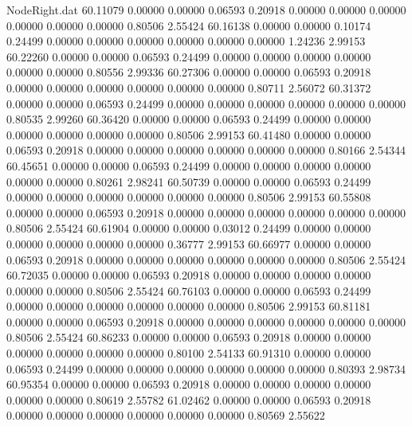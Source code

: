 \begin{filecontents}{NodeRight.dat}
  60.11079    0.00000    0.00000     0.06593    0.20918    0.00000    0.00000    0.00000    0.00000    0.00000    0.00000    0.80506    2.55424
  60.16138    0.00000    0.00000     0.10174    0.24499    0.00000    0.00000    0.00000    0.00000    0.00000    0.00000    1.24236    2.99153
  60.22260    0.00000    0.00000     0.06593    0.24499    0.00000    0.00000    0.00000    0.00000    0.00000    0.00000    0.80556    2.99336
  60.27306    0.00000    0.00000     0.06593    0.20918    0.00000    0.00000    0.00000    0.00000    0.00000    0.00000    0.80711    2.56072
  60.31372    0.00000    0.00000     0.06593    0.24499    0.00000    0.00000    0.00000    0.00000    0.00000    0.00000    0.80535    2.99260
  60.36420    0.00000    0.00000     0.06593    0.24499    0.00000    0.00000    0.00000    0.00000    0.00000    0.00000    0.80506    2.99153
  60.41480    0.00000    0.00000     0.06593    0.20918    0.00000    0.00000    0.00000    0.00000    0.00000    0.00000    0.80166    2.54344
  60.45651    0.00000    0.00000     0.06593    0.24499    0.00000    0.00000    0.00000    0.00000    0.00000    0.00000    0.80261    2.98241
  60.50739    0.00000    0.00000     0.06593    0.24499    0.00000    0.00000    0.00000    0.00000    0.00000    0.00000    0.80506    2.99153
  60.55808    0.00000    0.00000     0.06593    0.20918    0.00000    0.00000    0.00000    0.00000    0.00000    0.00000    0.80506    2.55424
  60.61904    0.00000    0.00000     0.03012    0.24499    0.00000    0.00000    0.00000    0.00000    0.00000    0.00000    0.36777    2.99153
  60.66977    0.00000    0.00000     0.06593    0.20918    0.00000    0.00000    0.00000    0.00000    0.00000    0.00000    0.80506    2.55424
  60.72035    0.00000    0.00000     0.06593    0.20918    0.00000    0.00000    0.00000    0.00000    0.00000    0.00000    0.80506    2.55424
  60.76103    0.00000    0.00000     0.06593    0.24499    0.00000    0.00000    0.00000    0.00000    0.00000    0.00000    0.80506    2.99153
  60.81181    0.00000    0.00000     0.06593    0.20918    0.00000    0.00000    0.00000    0.00000    0.00000    0.00000    0.80506    2.55424
  60.86233    0.00000    0.00000     0.06593    0.20918    0.00000    0.00000    0.00000    0.00000    0.00000    0.00000    0.80100    2.54133
  60.91310    0.00000    0.00000     0.06593    0.24499    0.00000    0.00000    0.00000    0.00000    0.00000    0.00000    0.80393    2.98734
  60.95354    0.00000    0.00000     0.06593    0.20918    0.00000    0.00000    0.00000    0.00000    0.00000    0.00000    0.80619    2.55782
  61.02462    0.00000    0.00000     0.06593    0.20918    0.00000    0.00000    0.00000    0.00000    0.00000    0.00000    0.80569    2.55622

\end{filecontents}
